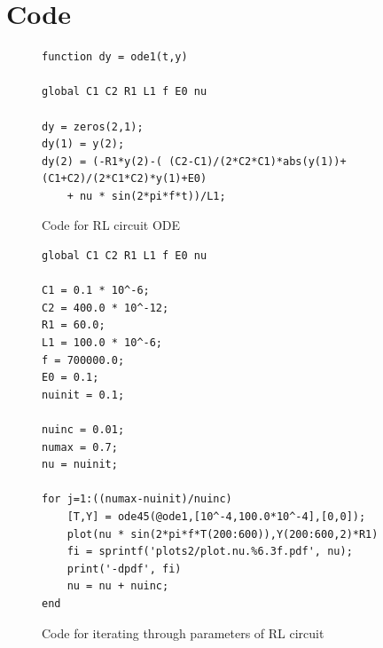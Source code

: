 \documentclass[12pt]{report}
\begin{document}
\section{Code}
\label{sec: Code}

\begin{figure}[h]
\begin{lstlisting}
function dy = ode1(t,y)

global C1 C2 R1 L1 f E0 nu

dy = zeros(2,1);
dy(1) = y(2);
dy(2) = (-R1*y(2)-( (C2-C1)/(2*C2*C1)*abs(y(1))+ (C1+C2)/(2*C1*C2)*y(1)+E0)
	+ nu * sin(2*pi*f*t))/L1;
\end{lstlisting}
\caption{Code for RL circuit ODE}
\label{code:ode}
\end{figure}

\begin{figure}[h]
\begin{lstlisting}
global C1 C2 R1 L1 f E0 nu

C1 = 0.1 * 10^-6;
C2 = 400.0 * 10^-12;
R1 = 60.0;
L1 = 100.0 * 10^-6;
f = 700000.0;
E0 = 0.1;
nuinit = 0.1;

nuinc = 0.01;
numax = 0.7;
nu = nuinit;

for j=1:((numax-nuinit)/nuinc)
    [T,Y] = ode45(@ode1,[10^-4,100.0*10^-4],[0,0]);
    plot(nu * sin(2*pi*f*T(200:600)),Y(200:600,2)*R1)
    fi = sprintf('plots2/plot.nu.%6.3f.pdf', nu);
    print('-dpdf', fi)
    nu = nu + nuinc;
end
\end{lstlisting}
	\caption{Code for iterating through parameters of RL circuit}
	\label{code:run}
\end{figure}



\end{document}
